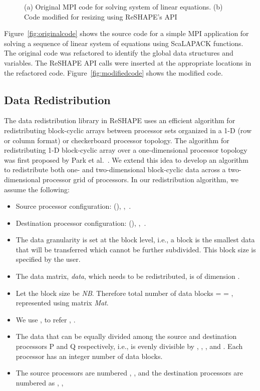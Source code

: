 \documentclass[letterpaper]{llncs}
\begin{document}
\begin{figure}[!ht]
\begin{center}
\end{center}
\caption{(a) Original MPI code for solving system of linear equations. (b) Code modified for resizing using ReSHAPE's API}
\end{figure}

Figure~\ref{fig:originalcode} shows the source code for a simple MPI application for solving a sequence of linear system of equations using ScaLAPACK functions.
The original code was refactored to identify the global data structures and variables. The ReSHAPE API calls were inserted at the appropriate locations in the refactored code.
Figure~\ref{fig:modifiedcode} shows the modified code. 
\subsection{Data Redistribution}
\label{subsec:Dataredist}
The data redistribution library in ReSHAPE uses an efficient algorithm for redistributing block-cyclic  arrays between processor sets organized in a 1-D (row or column format) or checkerboard processor topology. 
The algorithm for redistributing 1-D block-cyclic array over a one-dimensional processor topology was first proposed by Park et al.~\cite{park}. 
We extend this idea to develop an algorithm to redistribute both one- and two-dimensional block-cyclic data 
across a two-dimensional processor grid of processors.
In our redistribution algorithm, we assume the following:
\begin{itemize}
\item 	Source processor configuration:  (), ,\, .
\item 	Destination processor configuration:  (), ,\, .
\item 	The data granularity is set at the block level, i.e., a block is the smallest data that will be transferred which cannot be further subdivided. 
        This block size is specified by the user.
\item 	The data matrix, \textit{data}, which needs to be redistributed, is of dimension .
\item 	Let the block size be \textit{NB}. Therefore total number of data blocks = 
      = , represented using matrix \textit{Mat}.
\item 	We use , to refer , .
\item   The data that can be equally divided among the source and destination processors P and Q respectively,
        i.e.,  is evenly divisible by , , , and . Each processor has an integer number of data blocks.
\item The source processors are numbered , ,  and the destination processors are numbered as , , 
\end{itemize}
\end{document}
